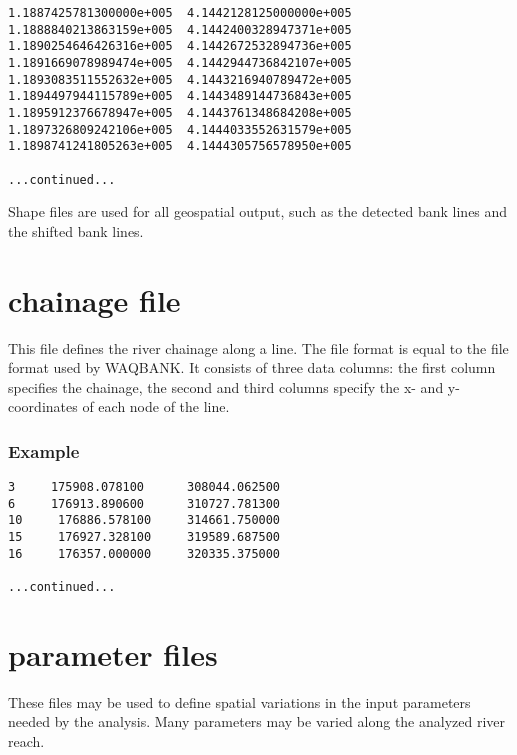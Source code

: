 \begin{Verbatim}
1.1887425781300000e+005  4.1442128125000000e+005
1.1888840213863159e+005  4.1442400328947371e+005
1.1890254646426316e+005  4.1442672532894736e+005
1.1891669078989474e+005  4.1442944736842107e+005
1.1893083511552632e+005  4.1443216940789472e+005
1.1894497944115789e+005  4.1443489144736843e+005
1.1895912376678947e+005  4.1443761348684208e+005
1.1897326809242106e+005  4.1444033552631579e+005
1.1898741241805263e+005  4.1444305756578950e+005

...continued...
\end{Verbatim}

Shape files are used for all geospatial output, such as the detected bank lines and the shifted bank lines.

\section{chainage file}

This file defines the river chainage along a line.
The file format is equal to the file format used by WAQBANK.
It consists of three data columns: the first column specifies the chainage, the second and third columns specify the x- and y-coordinates of each node of the line.

\subsubsection*{Example}

\begin{Verbatim}
3     175908.078100      308044.062500
6     176913.890600      310727.781300
10     176886.578100     314661.750000
15     176927.328100     319589.687500
16     176357.000000     320335.375000

...continued...
\end{Verbatim}

\section{parameter files} \label{Sec:parfile}

These files may be used to define spatial variations in the input parameters needed by the analysis.
Many parameters may be varied along the analyzed river reach.

